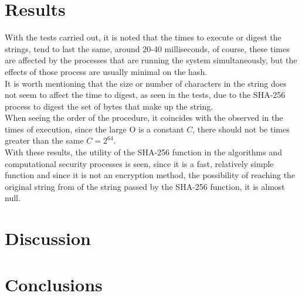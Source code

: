\documentclass[journal]{IEEEtran}
\begin{document}
\section{Results}
With the tests carried out, it is noted that the times to execute or digest the strings, tend to last the same, around 20-40 milliseconds,
of course, these times are affected by the processes that are running the system simultaneously, but the effects of those process are usually minimal on the hash.\\It is worth mentioning that the size or number of characters in the string does not seem to affect the time to digest, as seen in the tests, due to the SHA-256 process to digest the set of bytes that make up the string.\\When seeing the order of the procedure, it coincides with the observed in the times of execution, since the large O is a constant $C$, there should not be times greater than the same $C=2^{64}$.\\With these results, the utility of the SHA-256 function in the algorithms and computational security processes is seen, since it is a fast, relatively simple function and since it is not an encryption method, the possibility of reaching the original string from of the string passed by the SHA-256 function, it is almost null.
\section{Discussion}
\section{Conclusions}
\end{document}
